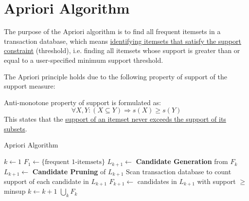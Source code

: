 
\section{Apriori Algorithm}
The purpose of the Apriori algorithm is to find all frequent itemsets in a transaction database, which means \ul{identifying itemsets that satisfy the support constraint} (threshold), i.e. finding all itemsets whose support is greater than or equal to a user-specified minimum support threshold.

The Apriori principle holds due to the following property of support of the support measure:
\begin{definition}
   Anti-monotone property of support is formulated as:
   \[
      \forall X,Y : (X \subseteq Y) \Rightarrow s(X) \geq s(Y)
   \]
   This states that the \ul{support of an itemset never exceeds the support of its
   subsets}.
\end{definition}

\begin{algorithm}[H]
\caption{Apriori Algorithm}
\begin{algorithmic}[1]
\State $k \gets 1$
\State $F_1 \gets \{\text{frequent 1-itemsets}\}$ 
\Repeat
\State $L_{k+1} \gets$ \textbf{Candidate Generation} from $F_k$ 
\State $L_{k+1} \gets$ \textbf{Candidate Pruning} of $L_{k+1}$ 
\State Scan transaction database to count support of each candidate in $L_{k+1}$
\State $F_{k+1} \gets$ candidates in $L_{k+1}$ with support $\geq$ minsup
\State $k \gets k + 1$
\State \Return $\bigcup_k F_k$ 
\end{algorithmic}
\end{algorithm}

